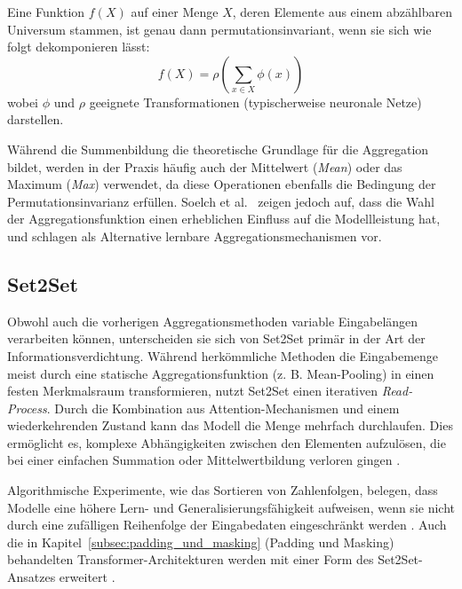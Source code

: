     \begin{theorem}
    Eine Funktion $f(X)$ auf einer Menge $X$, deren Elemente aus einem abzählbaren Universum stammen, ist genau dann permutationsinvariant, wenn sie sich wie folgt dekomponieren lässt:
    \[
    f(X) = \rho \left( \sum_{x \in X} \phi(x) \right)
    \]
    wobei $\phi$ und $\rho$ geeignete Transformationen (typischerweise neuronale Netze) darstellen.
    \end{theorem}

    Während die Summenbildung die theoretische Grundlage für die Aggregation bildet, werden in der Praxis häufig auch der Mittelwert (\textit{Mean}) oder das Maximum (\textit{Max}) verwendet, da diese Operationen ebenfalls die Bedingung der Permutationsinvarianz erfüllen. Soelch et al.~\cite{soelch2019deepsetAgg} zeigen jedoch auf, dass die Wahl der Aggregationsfunktion einen erheblichen Einfluss auf die Modellleistung hat, und schlagen als Alternative lernbare Aggregationsmechanismen vor.

    \subsection{Set2Set}
    \label{subsec:set2set}
  
    Obwohl auch die vorherigen Aggregationsmethoden variable Eingabelängen verarbeiten können, unterscheiden sie sich von Set2Set primär in der Art der Informationsverdichtung. Während herkömmliche Methoden die Eingabemenge meist durch eine statische Aggregationsfunktion (z. B. Mean-Pooling) in einen festen Merkmalsraum transformieren, nutzt Set2Set einen iterativen \textit{Read-Process}. Durch die Kombination aus Attention-Mechanismen und einem wiederkehrenden Zustand kann das Modell die Menge mehrfach durchlaufen. Dies ermöglicht es, komplexe Abhängigkeiten zwischen den Elementen aufzulösen, die bei einer einfachen Summation oder Mittelwertbildung verloren gingen \cite{vinyals2016orderm}.

    Algorithmische Experimente, wie das Sortieren von Zahlenfolgen, belegen, dass Modelle eine höhere Lern- und Generalisierungsfähigkeit aufweisen, wenn sie nicht durch eine zufälligen Reihenfolge der Eingabedaten eingeschränkt werden \cite{vinyals2016orderm}. Auch die in Kapitel~\ref{subsec:padding_und_masking} (Padding und Masking) behandelten Transformer-Architekturen werden mit einer Form des Set2Set-Ansatzes erweitert \cite{vaswani2017attention}.
    

